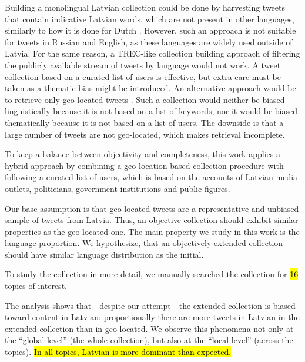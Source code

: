 \documentclass{IOS-Book-Article}
\begin{document}
%
Building a monolingual Latvian collection could be done by harvesting tweets that contain indicative Latvian words, which are not present in other languages, similarly to how it is done for Dutch \cite{sang2013}. However, such an approach is not suitable for tweets in Russian and English, as these languages are widely used outside of Latvia.
%
For the same reason, a TREC-like collection building approach \cite{lin2017rts} of filtering the publicly available stream of tweets by language would not work.
%
A tweet collection based on a curated list of users \cite{SANVICENTE16.465,L14-1642} is effective, but extra care must be taken as a thematic bias might be introduced.
%
An alternative approach would be to retrieve only geo-located tweets \cite{coats_steven_2017,milajevs:2017:BUCC}. Such a collection would neither be biased linguistically because it is not based on a list of keywords, nor it would be biased thematically because it is not based on a list of users. The downside is that a large number of tweets are not geo-located, which makes retrieval incomplete.

To keep a balance between objectivity and completeness, this work applies a hybrid approach by combining a geo-location based collection procedure with following a curated list of users, which is based on the accounts of Latvian media outlets, politicians, government institutions and public figures.

Our base assumption is that geo-located tweets are a representative and unbiased sample of tweets from Latvia. Thus, an objective collection should exhibit similar properties as the geo-located one. The main property we study in this work is the language proportion. We hypothesize, that an objectively extended collection should have similar language distribution as the initial.

To study the collection in more detail, we manually searched the collection for \hl{16} topics of interest.


The analysis shows that---despite our attempt---the extended collection is biased toward content in Latvian: proportionally there are more tweets in Latvian in the extended collection than in geo-located. We observe this phenomena not only at the ``global level'' (the whole collection), but also at the ``local level'' (across the topics). \hl{In all topics, Latvian is more dominant than expected.}
\end{document}

